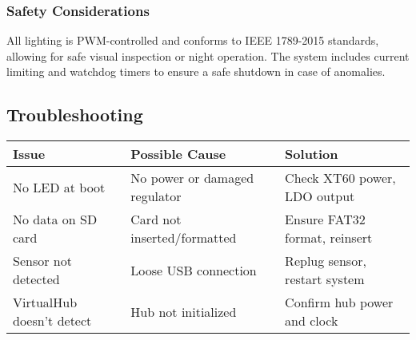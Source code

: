 \documentclass[../main.tex]{subfiles}
\begin{document}
\subsubsection{Safety Considerations}
All lighting is PWM-controlled and conforms to IEEE 1789-2015 standards, allowing for safe visual inspection or night operation. The system includes current limiting and watchdog timers to ensure a safe shutdown in case of anomalies.

\subsection{Troubleshooting}
\begin{tabular}{|l|l|l|}
\hline
\textbf{Issue} & \textbf{Possible Cause} & \textbf{Solution} \\
\hline
No LED at boot & No power or damaged regulator & Check XT60 power, LDO output \\
\hline
No data on SD card & Card not inserted/formatted & Ensure FAT32 format, reinsert \\
\hline
Sensor not detected & Loose USB connection & Replug sensor, restart system \\
\hline
VirtualHub doesn't detect & Hub not initialized & Confirm hub power and clock \\
\hline
\end{tabular}
\end{document}
